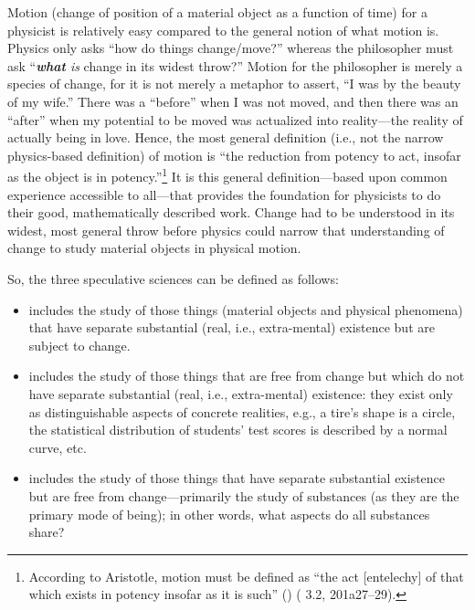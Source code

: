 \label{page:motion}Motion (change of position of a material object as a function of time) for a physicist is relatively easy compared to the general notion of what motion is. Physics only asks ``how do things change/move?'' whereas the philosopher must ask ``\textit{\textbf{what} is} change in its widest throw?'' Motion for the philosopher is merely a species of change, for it is not merely a metaphor to assert, ``I was  by the beauty of my wife.'' There was a ``before'' when I was not moved, and then there was an ``after'' when my potential to be moved was actualized into reality---the reality of actually being in love. Hence, the most general definition (i.e., not the narrow physics-based definition) of motion is ``the reduction from potency to act, insofar as the object is in potency.''\footnote{According to Aristotle, motion must be defined as ``the act [entelechy] of that which exists in potency insofar as it is such'' () ( 3.2, 201a27--29).} It is this general definition---based upon common experience accessible to all---that provides the foundation for physicists to do their good, mathematically described work. Change had to be understood in its widest, most general throw before physics could narrow that understanding of change to study material objects in physical motion.

So, the three speculative sciences can be defined as follows:

\begin{itemize}
\item {} includes the study of those things (material objects and physical phenomena) that have separate substantial (real, i.e., extra-mental) existence but are subject to change.
\item {} includes the study of those things that are free from change but which do not have separate substantial (real, i.e., extra-mental) existence: they exist only as distinguishable aspects of concrete realities, e.g., a tire's shape is a circle, the statistical distribution of students' test scores is described by a normal curve, etc.
\item {} includes the study of those things that have separate substantial existence but are free from change---primarily the study of substances (as they are the primary mode of being); in other words, what aspects do all substances share?
\end{itemize}

